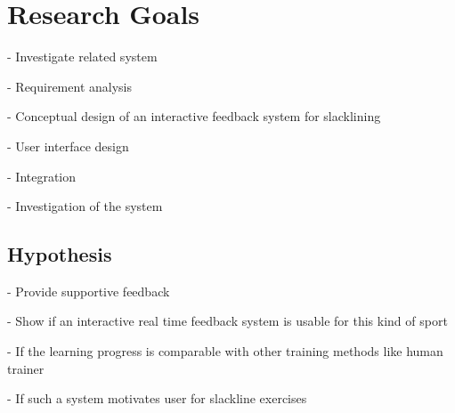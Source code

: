 \section{Research Goals}
- Investigate related system

- Requirement analysis

- Conceptual design of an interactive feedback system for slacklining

- User interface design

- Integration

- Investigation of the system

\subsection{Hypothesis}
- Provide supportive feedback

- Show if an interactive real time feedback system is usable for this kind of sport

- If the learning progress is comparable with other training methods like human trainer

- If such a system motivates user for slackline exercises